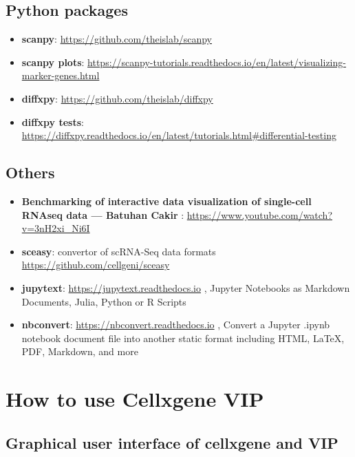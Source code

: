 \documentclass[
]{article}
\providecommand{\tightlist}{%
  \setlength{\itemsep}{0pt}\setlength{\parskip}{0pt}}
\begin{document}
\hypertarget{python-packages}{%
\subsection*{Python packages}\label{python-packages}}

\begin{itemize}
\tightlist
\item
  \textbf{scanpy}: \url{https://github.com/theislab/scanpy}
\item
  \textbf{scanpy plots}: \url{https://scanpy-tutorials.readthedocs.io/en/latest/visualizing-marker-genes.html}
\item
  \textbf{diffxpy}: \url{https://github.com/theislab/diffxpy}
\item
  \textbf{diffxpy tests}: \url{https://diffxpy.readthedocs.io/en/latest/tutorials.html\#differential-testing}
\end{itemize}

\hypertarget{others}{%
\subsection*{Others}\label{others}}

\begin{itemize}
\tightlist
\item
  \textbf{Benchmarking of interactive data visualization of single-cell RNAseq data --- Batuhan Cakir} : \url{https://www.youtube.com/watch?v=3nH2xi_Ni6I}
\item
  \textbf{sceasy}: convertor of scRNA-Seq data formats \url{https://github.com/cellgeni/sceasy}
\item
  \textbf{jupytext}: \url{https://jupytext.readthedocs.io} , Jupyter Notebooks as Markdown Documents, Julia, Python or R Scripts
\item
  \textbf{nbconvert}: \url{https://nbconvert.readthedocs.io} , Convert a Jupyter .ipynb notebook document file into another static format including HTML, LaTeX, PDF, Markdown, and more
\end{itemize}

\hypertarget{how-to-use-cellxgene-vip}{%
\section{How to use Cellxgene VIP}\label{how-to-use-cellxgene-vip}}

\hypertarget{graphical-user-interface-of-cellxgene-and-vip}{%
\subsection{Graphical user interface of cellxgene and VIP}\label{graphical-user-interface-of-cellxgene-and-vip}}
\end{document}
